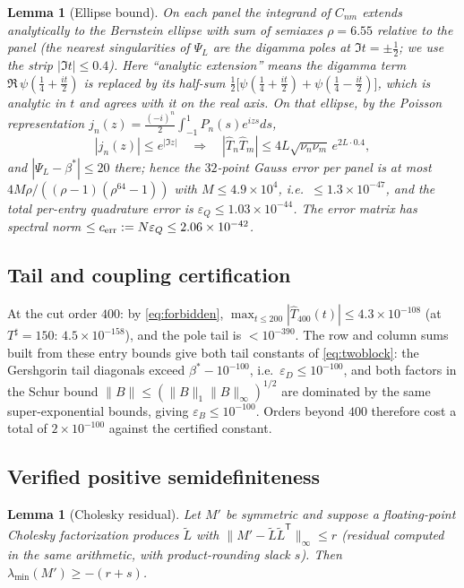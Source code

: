 ﻿\documentclass[11pt]{article}
\newtheorem{lemma}[theorem]{Lemma}
\newcommand{\lammin}{\lambda_{\min}}
\newcommand{\Tsharp}{T^{\sharp}}
\begin{document}
\begin{lemma}[Ellipse bound]\label{lem:quad}
On each panel the integrand of $C_{nm}$ extends analytically to the
Bernstein ellipse with sum of semiaxes $\rho=6.55$ relative to the
panel (the nearest singularities of $\Psi_L$ are the digamma poles at
$\Im t=\pm\frac12$; we use the strip $|\Im t|\le0.4$).  Here
``analytic extension'' means the digamma term
$\Re\,\psi(\tfrac14+\tfrac{it}2)$ is replaced by its half-sum
$\tfrac12\bigl[\psi(\tfrac14+\tfrac{it}2)+\psi(\tfrac14-\tfrac{it}2)\bigr]$,
which is analytic in $t$ and agrees with it on the real axis.  On that
ellipse, by the Poisson representation
$j_n(z)=\frac{(-i)^n}2\int_{-1}^1P_n(s)e^{izs}ds$,
\[
|j_n(z)|\le e^{|\Im z|}
\quad\Rightarrow\quad
|\widehat T_n\widehat T_m|\le 4L\sqrt{\nu_n\nu_m}\,e^{2L\cdot0.4},
\]
and $|\Psi_L-\beta^*|\le20$ there; hence the $32$-point Gauss error
per panel is at most $4M\rho/((\rho-1)(\rho^{64}-1))$ with
$M\le4.9\times10^4$, i.e.\ $\le1.3\times10^{-47}$, and the total
per-entry quadrature error is $\varepsilon_Q\le1.03\times10^{-44}$.
The error matrix has spectral norm
$\le c_{\rm err}:=N\varepsilon_Q\le2.06\times10^{-42}$.
\end{lemma}

\subsection{Tail and coupling certification}
At the cut order $400$: by \eqref{eq:forbidden},
$\max_{t\le200}|\widehat T_{400}(t)|\le4.3\times10^{-108}$ (at
$\Tsharp=150$: $4.5\times10^{-158}$), and the pole tail is
$<10^{-390}$.  The row and column sums built from these entry bounds
give both tail constants of \eqref{eq:twoblock}: the Gershgorin tail
diagonals exceed $\beta^*-10^{-100}$, i.e.\
$\varepsilon_D\le10^{-100}$, and both factors in the Schur bound
$\|B\|\le(\|B\|_1\|B\|_\infty)^{1/2}$ are dominated by the same
super-exponential bounds, giving $\varepsilon_B\le10^{-100}$.  Orders
beyond $400$ therefore cost a total of $2\times10^{-100}$ against the
certified constant.

\subsection{Verified positive semidefiniteness}

\begin{lemma}[Cholesky residual]\label{lem:psd}
Let $M'$ be symmetric and suppose a floating-point Cholesky
factorization produces $\tilde L$ with
$\|M'-\tilde L\tilde L^{\mathsf T}\|_\infty\le r$ (residual computed
in the same arithmetic, with product-rounding slack $s$).  Then
$\lammin(M')\ge-(r+s)$.
\end{lemma}
\end{document}
